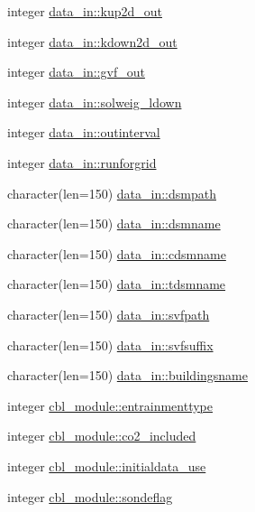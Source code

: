 \begin{DoxyCompactItemize}
\item 
integer \hyperlink{namespacedata__in_acaad819231464876d06a326598caf5d1}{data\+\_\+in\+::kup2d\+\_\+out}
\item 
integer \hyperlink{namespacedata__in_aca062f5e8ccbe43035af3dd5d7199ac4}{data\+\_\+in\+::kdown2d\+\_\+out}
\item 
integer \hyperlink{namespacedata__in_a6e0cf4ed5e44b4ec04403466ed583117}{data\+\_\+in\+::gvf\+\_\+out}
\item 
integer \hyperlink{namespacedata__in_ad47d3fca8d8d48dabc51d4838153fab9}{data\+\_\+in\+::solweig\+\_\+ldown}
\item 
integer \hyperlink{namespacedata__in_aa192321c93659ded79b2485baaa901b3}{data\+\_\+in\+::outinterval}
\item 
integer \hyperlink{namespacedata__in_ae2ab3d89e50ddafe5bdb6f79aeb6d690}{data\+\_\+in\+::runforgrid}
\item 
character(len=150) \hyperlink{namespacedata__in_a682487b527aac38b57ec89a935d5c4bc}{data\+\_\+in\+::dsmpath}
\item 
character(len=150) \hyperlink{namespacedata__in_a1d1b3d576c2ec06ca44f4ce7bbcd7532}{data\+\_\+in\+::dsmname}
\item 
character(len=150) \hyperlink{namespacedata__in_adbc74fe8df00866071b1a4717dcd596c}{data\+\_\+in\+::cdsmname}
\item 
character(len=150) \hyperlink{namespacedata__in_a3c00e15acbb88a04c775598e59d70f87}{data\+\_\+in\+::tdsmname}
\item 
character(len=150) \hyperlink{namespacedata__in_a5e692de4d121a71a5a0fd4bcd9d640d2}{data\+\_\+in\+::svfpath}
\item 
character(len=150) \hyperlink{namespacedata__in_a30a09c738fb29d9032e8a4cf1018b0d9}{data\+\_\+in\+::svfsuffix}
\item 
character(len=150) \hyperlink{namespacedata__in_ab3871d34bee8f498572c4fae8900e97e}{data\+\_\+in\+::buildingsname}
\item 
integer \hyperlink{namespacecbl__module_a904519e3dcaa1592e2506c840b8cc7e4}{cbl\+\_\+module\+::entrainmenttype}
\item 
integer \hyperlink{namespacecbl__module_a1fe4af3f4b8ea35de69189177bcc9d5d}{cbl\+\_\+module\+::co2\+\_\+included}
\item 
integer \hyperlink{namespacecbl__module_ad06cbd2f8723521c7d20e7d57ebe0f9c}{cbl\+\_\+module\+::initialdata\+\_\+use}
\item 
integer \hyperlink{namespacecbl__module_a546f4ac8b1d6305356caf940d8e8e342}{cbl\+\_\+module\+::sondeflag}

\end{DoxyCompactItemize}
